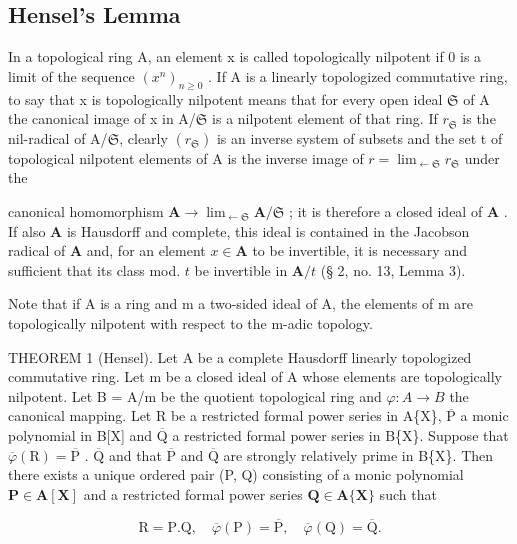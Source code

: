 \subsection{Hensel's Lemma}

In a topological ring A, an element x is called topologically nilpotent if 0 is a limit of the sequence \((x^{n})_{n\geqslant0}\) . If A is a linearly topologized commutative ring, to say that x is topologically nilpotent means that for every open ideal \(\mathfrak{S}\) of A the canonical image of x in A/\(\mathfrak{S}\) is a nilpotent element of that ring. If \(r_{\mathfrak{S}}\) is the nil-radical of A/\(\mathfrak{S}\), clearly \((r_{\mathfrak{S}})\) is an inverse system of subsets and the set t of topological nilpotent elements of A is the inverse image of \(r=\lim_{\leftarrow \mathfrak{S}}r_{\mathfrak{S}}\) under the

canonical homomorphism \(\mathbf{A} \to \lim_{\leftarrow \mathfrak{S}} \mathbf{A} / \mathfrak{S}\) ; it is therefore a closed ideal of \(\mathbf{A}\) . If also \(\mathbf{A}\) is Hausdorff and complete, this ideal is contained in the Jacobson radical of \(\mathbf{A}\) and, for an element \(x \in \mathbf{A}\) to be invertible, it is necessary and sufficient that its class mod. \(t\) be invertible in \(\mathbf{A} / t\) (§ 2, no. 13, Lemma 3).

Note that if A is a ring and m a two-sided ideal of A, the elements of m are topologically nilpotent with respect to the m-adic topology.

THEOREM 1 (Hensel). Let A be a complete Hausdorff linearly topologized commutative ring. Let m be a closed ideal of A whose elements are topologically nilpotent. Let B = A/m be the quotient topological ring and \(\varphi: A \to B\) the canonical mapping. Let R be a restricted formal power series in A\{X\}, \(\overline{\mathrm{P}}\) a monic polynomial in B{[}X{]} and \(\overline{\mathrm{Q}}\) a restricted formal power series in B\{X\}. Suppose that \(\overline{\varphi}(\mathrm{R}) = \overline{\mathrm{P}}\) . \(\overline{\mathrm{Q}}\) and that \(\overline{\mathrm{P}}\) and \(\overline{\mathrm{Q}}\) are strongly relatively prime in B\{X\}. Then there exists a unique ordered pair (P, Q) consisting of a monic polynomial \(\mathbf{P} \in \mathbf{A}[\mathbf{X}]\) and a restricted formal power series \(\mathbf{Q} \in \mathbf{A}\{\mathbf{X}\}\) such that

\[
\mathrm{R} = \mathrm{P}. \mathrm{Q}, \quad \overline {{{\varphi}}} (\mathrm{P}) = \overline {{{\mathrm{P}}}}, \quad \overline {{{\varphi}}} (\mathrm{Q}) = \overline {{{\mathrm{Q}}}}.\tag{4}
\]

